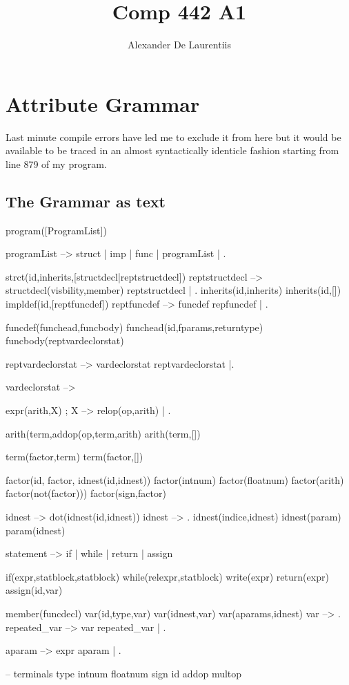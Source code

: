 \documentclass{article}
\author{Alexander De Laurentiis}
\title{Comp 442 A1}
\begin{document}
\maketitle
\section{Attribute Grammar}
Last minute compile errors have led me to exclude it from here but it would be available to be traced in an almost syntactically identicle fashion starting from line 879 of my program.

\subsection{The Grammar as text}

program([ProgramList])

programList --> struct | imp | func | programList | .

strct(id,inherits,[structdecl|reptstructdecl])
reptstructdecl --> structdecl(visbility,member) reptstructdecl | .
inherits(id,inherits)
inherits(id,[])
impldef(id,[reptfuncdef])
reptfuncdef --> funcdef repfuncdef | .

funcdef(funchead,funcbody)
funchead(id,fparams,returntype)
funcbody(reptvardeclorstat)

reptvardeclorstat --> vardeclorstat reptvardeclorstat |.

vardeclorstat --> 

expr(arith,X) ; X --> relop(op,arith) | .

arith(term,addop(op,term,arith)
arith(term,[])

term(factor,term)
term(factor,[])

factor(id, factor, idnest(id,idnest))
factor(intnum)
factor(floatnum)
factor(arith)
factor(not(factor)))
factor(sign,factor)

idnest --> dot(idnest(id,idnest))
idnest --> .
idnest(indice,idnest)
idnest(param)
param(idnest)

statement --> if | while | return | assign

if(expr,statblock,statblock)
while(relexpr,statblock)
write(expr)
return(expr)
assign(id,var)

member(funcdecl)
var(id,type,var)
var(idnest,var)
var(aparams,idnest)
var --> .
repeated_var --> var repeated_var | .

aparam --> expr aparam | .

-- terminals
type
intnum
floatnum
sign
id
addop
multop
\end{document}
